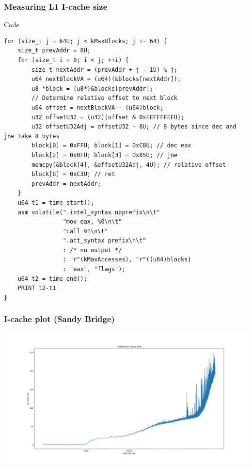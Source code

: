 \documentclass{beamer}
\begin{document}
\begin{frame}[fragile]
\frametitle{Measuring L1 I-cache size}
\begin{block}{Code}
\begin{lstlisting}[style=code]
for (size_t j = 64U; j < kMaxBlocks; j += 64) {
    size_t prevAddr = 0U;
    for (size_t i = 0; i < j; ++i) {
        size_t nextAddr = (prevAddr + j - 1U) % j;
        u64 nextBlockVA = (u64)(&blocks[nextAddr]);
        u8 *block = (u8*)&blocks[prevAddr];
        // Determine relative offset to next block
        u64 offset = nextBlockVA - (u64)block;
        u32 offsetU32 = (u32)(offset & 0xFFFFFFFFU);
        u32 offsetU32Adj = offsetU32 - 8U; // 8 bytes since dec and jne take 8 bytes
        block[0] = 0xFFU; block[1] = 0xC8U; // dec eax
        block[2] = 0x0FU; block[3] = 0x85U; // jne
        memcpy(&block[4], &offsetU32Adj, 4U); // relative offset
        block[8] = 0xC3U; // ret
        prevAddr = nextAddr;
    }
    u64 t1 = time_start();
    asm volatile(".intel_syntax noprefix\n\t"
                 "mov eax, %0\n\t"
                 "call %1\n\t"
                 ".att_syntax prefix\n\t"
                 : /* no output */
                 : "r"(kMaxAccesses), "r"((u64)blocks)
                 : "eax", "flags");
    u64 t2 = time_end();
    PRINT t2-t1
}

\end{lstlisting}
\end{block}
\end{frame}

\begin{frame}
\frametitle{I-cache plot (Sandy Bridge)}
\centerline{\includegraphics[scale=.3]{img/instr_size_sandy_bridge.png}}
\end{frame}
\end{document}
